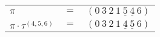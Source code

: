 \begin{example}\label{example:HGHICRCG}
  \hfill \break
  \begin{tabular}{lll}
    $\pi$ & $=$ & $({0}~{3}~{2}~{1}~\underline{{5}}~\underline{{4}}~{6})$ \\
    $\pi \cdot \tau^{(4,5,6)}$ & $=$ & $({0}~{3}~{2}~{1}~\underline{{4}}~\underline{{5}}~{6})$ \\
  \end{tabular}
\end{example}